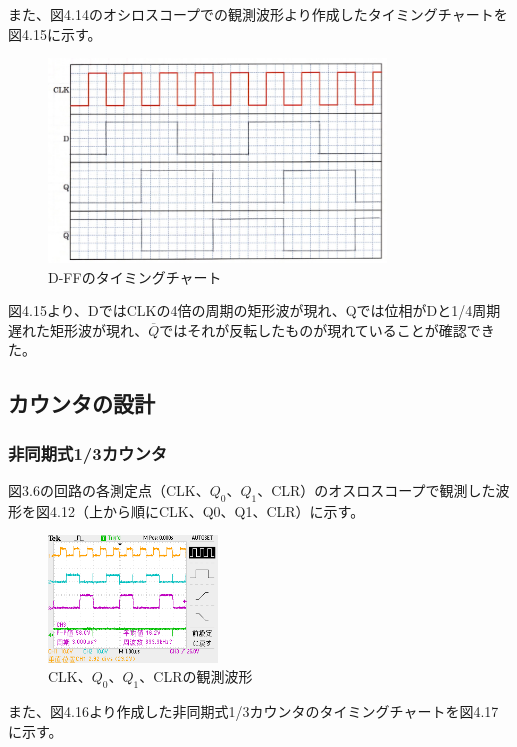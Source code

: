 \documentclass{jlreq}
\numberwithin{equation}{section}
\begin{document}
\begin{enumerate}
  また、図4.14のオシロスコープでの観測波形より作成したタイミングチャートを図4.15に示す。
  \begin{figure}[H]
  \centering
  \includegraphics[width=0.8\textwidth]{assets/dffchart.png}
  \caption{D-FFのタイミングチャート}
  \end{figure}

  図4.15より、DではCLKの4倍の周期の矩形波が現れ、Qでは位相がDと1/4周期遅れた矩形波が現れ、\(\overline{Q}\)ではそれが反転したものが現れていることが確認できた。
\end{enumerate}

\subsection{カウンタの設計}
\subsubsection{非同期式1/3カウンタ}
図3.6の回路の各測定点（CLK、\(Q_0\)、\(Q_1\)、CLR）のオスロスコープで観測した波形を図4.12（上から順にCLK、Q0、Q1、CLR）に示す。

\begin{figure}[H]
  \centering
  \includegraphics[width=0.4\textwidth]{assets/hidouki.png}
  \caption{CLK、\(Q_0\)、\(Q_1\)、CLRの観測波形}
\end{figure}

また、図4.16より作成した非同期式1/3カウンタのタイミングチャートを図4.17に示す。
\end{document}
